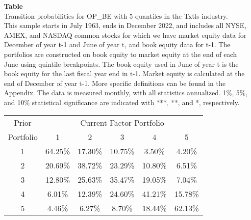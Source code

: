 \begin{table*}[ht!]
\raggedright
{}
\label{tab: transition_probs_OP_BE_Txtls_with_5_quantiles}
\textbf{Table \thetable} \\
Transition probabilities for OP_BE with 5 quantiles in the Txtls industry. \\
\hspace*{1em}This sample starts in July 1963, ends in December 2022, and includes all NYSE, AMEX, and NASDAQ common stocks for which we have market equity data for December of year t-1 and June of year t, and book equity data for t-1. The portfolios are constructed on book equity to market equity at the end of each June using quintile breakpoints.  The book equity used in June of year t is the book equity for the last fiscal year end in t-1.  Market equity is calculated at the end of December of year t-1.  More specific definitions can be found in the Appendix.  The data is measured monthly, with all statistics annualized.  1\%, 5\%, and 10\% statistical significance are indicated with ***, **, and *, respectively. \\
\vspace{0.5em}
\centering
\begin{adjustbox}{max width=\textwidth}
\begin{tabular}{@{}cccccc@{}}
\toprule
Prior & \multicolumn{5}{c}{Current Factor Portfolio} \\
Portfolio & 1 & 2 & 3 & 4 & 5 \\
\midrule
1 & 64.25\% & 17.30\% & 10.75\% & 3.50\% & 4.20\% \\
2 & 20.69\% & 38.72\% & 23.29\% & 10.80\% & 6.51\% \\
3 & 12.80\% & 25.63\% & 35.47\% & 19.05\% & 7.04\% \\
4 & 6.01\% & 12.39\% & 24.60\% & 41.21\% & 15.78\% \\
5 & 4.46\% & 6.27\% & 8.70\% & 18.44\% & 62.13\% \\
\bottomrule
\end{tabular}
\end{adjustbox}
\end{table*}